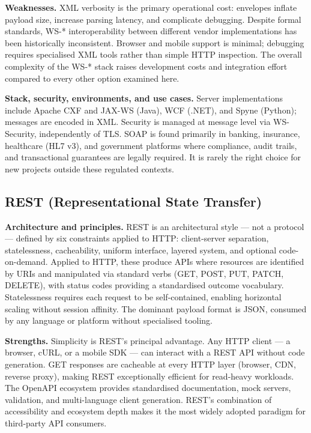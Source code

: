 \documentclass[11pt,a4paper]{article}
\begin{document}
\textbf{Weaknesses.}
XML verbosity is the primary operational cost: envelopes inflate payload size, increase
parsing latency, and complicate debugging. Despite formal standards, WS-* interoperability
between different vendor implementations has been historically inconsistent. Browser and
mobile support is minimal; debugging requires specialised XML tools rather than simple
HTTP inspection. The overall complexity of the WS-* stack raises development costs and
integration effort compared to every other option examined here.

\textbf{Stack, security, environments, and use cases.}
Server implementations include Apache CXF and JAX-WS (Java), WCF (.NET), and Spyne
(Python); messages are encoded in XML. Security is managed at message level via
WS-Security, independently of TLS. SOAP is found primarily in banking, insurance,
healthcare (HL7 v3), and government platforms where compliance, audit trails, and
transactional guarantees are legally required. It is rarely the right choice for new
projects outside these regulated contexts.

\subsection{REST (Representational State Transfer)}

\textbf{Architecture and principles.}
REST is an architectural style --- not a protocol --- defined by six constraints applied
to HTTP: client-server separation, statelessness, cacheability, uniform interface,
layered system, and optional code-on-demand. Applied to HTTP, these produce APIs where
resources are identified by URIs and manipulated via standard verbs (GET, POST, PUT,
PATCH, DELETE), with status codes providing a standardised outcome vocabulary. Statelessness
requires each request to be self-contained, enabling horizontal scaling without session
affinity. The dominant payload format is JSON, consumed by any language or platform
without specialised tooling.

\textbf{Strengths.}
Simplicity is REST's principal advantage. Any HTTP client --- a browser, cURL, or a
mobile SDK --- can interact with a REST API without code generation. GET responses are
cacheable at every HTTP layer (browser, CDN, reverse proxy), making REST exceptionally
efficient for read-heavy workloads. The OpenAPI ecosystem provides standardised
documentation, mock servers, validation, and multi-language client generation. REST's
combination of accessibility and ecosystem depth makes it the most widely adopted paradigm
for third-party API consumers.
\end{document}
